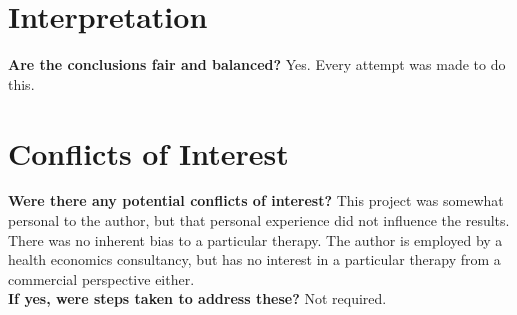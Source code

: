 \section{Interpretation}

\textbf{Are the conclusions fair and balanced?} Yes. Every attempt was made to do this. \\

\section{Conflicts of Interest}

\textbf{Were there any potential conflicts of interest?} This project was somewhat personal to the author, but that personal experience did not influence the results. There was no inherent bias to a particular therapy. The author is employed by a health economics consultancy, but has no interest in a particular therapy from a commercial perspective either.\\

\textbf{If yes, were steps taken to address these?} Not required.